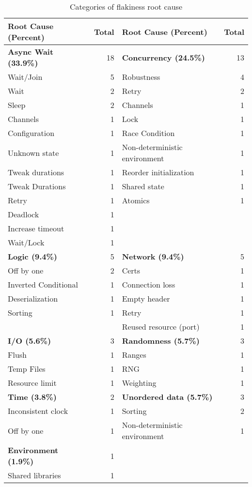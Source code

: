 \begin{table}[h!]
\centering
\caption{Categories of flakiness root cause 
}
\begin{tabular}{@{}lrlr@{}}
\toprule
\textbf{Root Cause (Percent)} & \textbf{Total} & \textbf{Root Cause (Percent)} & \textbf{Total} \\ \midrule
\addlinespace
\textbf{Async Wait (33.9\%)} & 18 & \textbf{Concurrency (24.5\%)} & 13 \\
Wait/Join & 5 & Robustness & 4 \\
Wait & 2 & Retry & 2 \\
Sleep & 2 & Channels & 1 \\
Channels & 1 & Lock & 1 \\
Configuration & 1 & Race Condition & 1 \\
Unknown state & 1 & Non-deterministic environment & 1 \\
Tweak durations & 1 & Reorder initialization & 1 \\
Tweak Durations & 1 & Shared state & 1 \\
Retry & 1 & Atomics & 1 \\
Deadlock & 1 & & \\
Increase timeout & 1 & & \\
Wait/Lock & 1 & & \\
\addlinespace
\textbf{Logic (9.4\%)} & 5 & \textbf{Network (9.4\%)} & 5 \\
Off by one & 2 & Certs & 1 \\
Inverted Conditional & 1 & Connection loss & 1 \\
Deserialization & 1 & Empty header & 1 \\
Sorting & 1 & Retry & 1 \\
& & Reused resource (port) & 1 \\
\addlinespace
\textbf{I/O (5.6\%)} & 3 & \textbf{Randomness (5.7\%)} & 3 \\
Flush & 1 & Ranges & 1 \\
Temp Files & 1 & RNG & 1 \\
Resource limit & 1 & Weighting & 1 \\
\addlinespace
\textbf{Time (3.8\%)} & 2 & \textbf{Unordered data (5.7\%)} & 3 \\
Inconsistent clock & 1 & Sorting & 2 \\
Off by one & 1 & Non-deterministic environment & 1 \\
\addlinespace
\textbf{Environment (1.9\%)} & 1 & & \\
Shared libraries & 1 & & \\
\bottomrule
\end{tabular}
\end{table}

